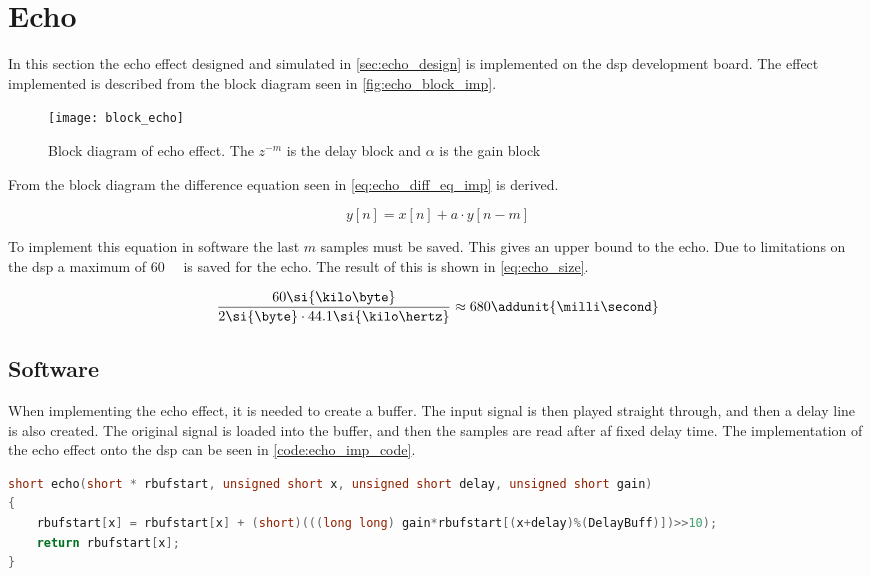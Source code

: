 \section{Echo}
\label{sec:echo_imp}
In this section the echo effect designed and simulated in \autoref{sec:echo_design} is implemented on the \gls{dsp} development board. The effect implemented is described from the block diagram seen in \autoref{fig:echo_block_imp}. 

\begin{figure}[htb]
	\centering
	\texttt{[image: block\_echo]}
	\caption{Block diagram of echo effect. The $z^{-m}$ is the delay block and $\alpha$ is the gain block}
		\label{fig:echo_block_imp}
\end{figure}

From the block diagram the difference equation seen in \autoref{eq:echo_diff_eq_imp} is derived. 

\begin{equation}\label{eq:echo_diff_eq_imp}
y[n]=x[n]+a\cdot y[n-m]
\end{equation}

To implement this equation in software the last $m$ samples must be saved. This gives an upper bound to the echo. Due to limitations on the \gls{dsp} a maximum of \SI{60}{\kilo\byte} is saved for the echo. The result of this is shown in \autoref{eq:echo_size}. 

\begin{equation}\label{eq:echo_size}
\frac{60 \si{\kilo\byte}}{2 \si{\byte} \cdot 44.1 \si{\kilo\hertz}} \approx 680
\addunit{\milli\second}
\end{equation}

\subsection{Software}
When implementing the echo effect, it is needed to create a buffer. The input signal is then played straight through, and then a delay line is also created. The original signal is loaded into the buffer, and then the samples are read after af fixed delay time. The implementation of the echo effect onto the \gls{dsp} can be seen in \autoref{code:echo_imp_code}.

\begin{lstlisting}[caption={Implementation of the echo effect on the DSP in C.},language=C,label={code:echo_imp_code},tabsize=2]
short echo(short * rbufstart, unsigned short x, unsigned short delay, unsigned short gain)
{
    rbufstart[x] = rbufstart[x] + (short)(((long long) gain*rbufstart[(x+delay)%(DelayBuff)])>>10);
    return rbufstart[x];
}
\end{lstlisting}

